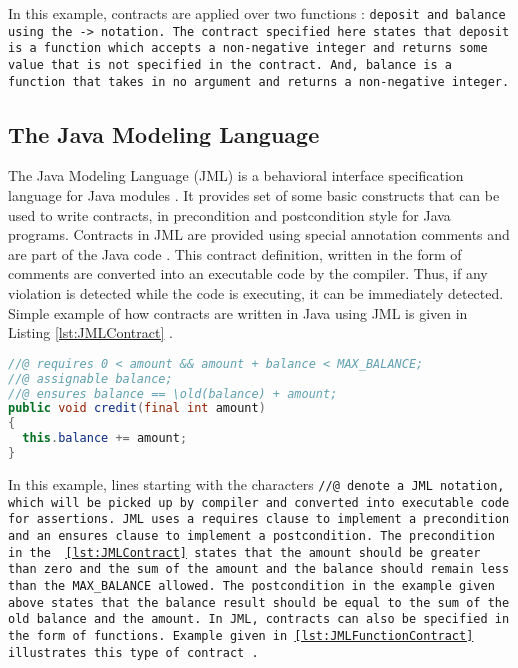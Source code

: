In this example, contracts are applied over two functions : \tt{deposit} and \tt{balance} using the -> notation. The contract specified here states that \tt{deposit} is a function which accepts a non-negative integer and returns some value that is not specified in the contract. And, \tt{balance} is a function that takes in no argument and returns a non-negative integer.

\subsection{The Java Modeling Language}
The Java Modeling Language (JML) is a behavioral interface specification language for Java modules \cite{leavens2006design}. It provides set of some basic constructs that can be used to write contracts, in precondition and postcondition style for Java programs. Contracts in JML are provided using special annotation comments and are part of the Java code \cite{leavens2006design}. This contract definition, written in the form of comments  are converted into an executable code by the compiler. Thus, if any violation is detected while the code is executing, it can be immediately detected. Simple example of how contracts are written in Java using JML is given in Listing \ref{lst:JMLContract}  \cite{JavaMode99:online}. \linebreak

\begin{minipage}{\linewidth}      
\begin{lstlisting}[frame=single, language=Java, caption={JML Contract Example\cite{JavaMode99:online} }, label={lst:JMLContract}, captionpos=b, breaklines=true]
//@ requires 0 < amount && amount + balance < MAX_BALANCE;
//@ assignable balance;
//@ ensures balance == \old(balance) + amount;
public void credit(final int amount)
{
  this.balance += amount;
}
\end{lstlisting}
\end{minipage}

In this example, lines starting with the characters \tt{//@} denote a JML notation, which will be picked up by compiler and converted into executable code for assertions.
JML uses a \tt{requires} clause to implement a precondition and an \tt{ensures} clause to implement a postcondition.
The precondition in the ~\ref{lst:JMLContract} states that the amount should be greater than zero and the sum of the amount and the balance should remain less than the MAX\_BALANCE allowed.
The postcondition in the example given above states that the balance result should be equal to the sum of the old balance and the amount.
In JML, contracts can also be specified in the form of functions. Example given in \ref{lst:JMLFunctionContract} illustrates this type of contract \cite{leavens2006design}. \linebreak
 
